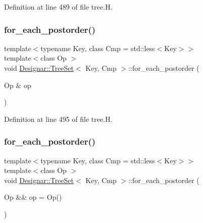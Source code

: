 Definition at line 489 of file tree.\+H.

\mbox{\label{class_designar_1_1_tree_set_ab59aacf4ca7cfe6c3753b5c4bd6c45e8}} 
\subsubsection{\texorpdfstring{for\+\_\+each\+\_\+postorder()}{for\_each\_postorder()}\hspace{0.1cm}{\footnotesize\ttfamily [1/2]}}
{\footnotesize\ttfamily template$<$typename Key, class Cmp = std\+::less$<$\+Key$>$$>$ \\
template$<$class Op $>$ \\
void \hyperlink{class_designar_1_1_tree_set}{Designar\+::\+Tree\+Set}$<$ Key, Cmp $>$\+::for\+\_\+each\+\_\+postorder (\begin{DoxyParamCaption}\item[{Op \&}]{op }\end{DoxyParamCaption})\hspace{0.3cm}{\ttfamily [inline]}}



Definition at line 495 of file tree.\+H.

\mbox{\label{class_designar_1_1_tree_set_ae00442533ecacddca2c61bfbbc2c0c94}} 
\subsubsection{\texorpdfstring{for\+\_\+each\+\_\+postorder()}{for\_each\_postorder()}\hspace{0.1cm}{\footnotesize\ttfamily [2/2]}}
{\footnotesize\ttfamily template$<$typename Key, class Cmp = std\+::less$<$\+Key$>$$>$ \\
template$<$class Op $>$ \\
void \hyperlink{class_designar_1_1_tree_set}{Designar\+::\+Tree\+Set}$<$ Key, Cmp $>$\+::for\+\_\+each\+\_\+postorder (\begin{DoxyParamCaption}\item[{Op \&\&}]{op = {\ttfamily Op()} }\end{DoxyParamCaption})\hspace{0.3cm}{\ttfamily [inline]}}



